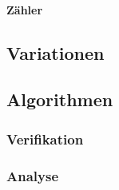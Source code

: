 \paragraph{Zähler}

\subsection{Variationen}

\subsection{Algorithmen}

\subsubsection{Verifikation}

\subsubsection{Analyse}

